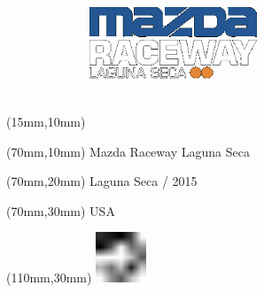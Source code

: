 \null\newpage
\begin{textblock*}{50mm}(15mm,10mm)%
\includegraphics[width=50mm]{LG/LAG.png}
\end{textblock*}
\begin{textblock*}{130mm}(70mm,10mm)%
{\fontsize{20}{20}\selectfont Mazda Raceway Laguna Seca}\\
\end{textblock*}
\begin{textblock*}{120mm}(70mm,20mm)%
{\fontsize{16}{16}\selectfont Laguna Seca / 2015}\\
\end{textblock*}
\begin{textblock*}{120mm}(70mm,30mm)%
{\fontsize{12}{12}\selectfont USA}
\end{textblock*}
\begin{textblock*}{30mm}(110mm,30mm)%
\centering
\includegraphics[height=15mm]{icons/fa-rotate-left.pdf}
\end{textblock*}
